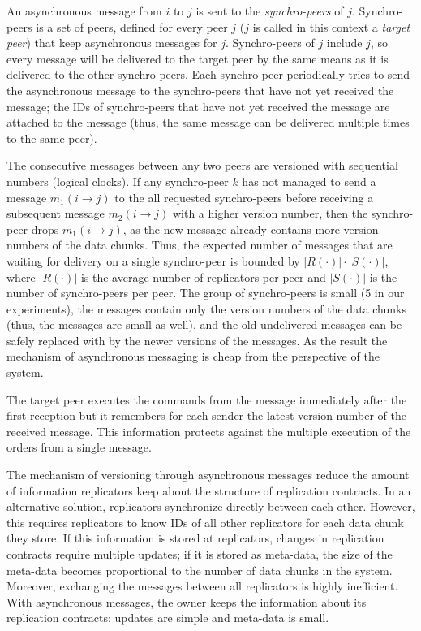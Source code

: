 \documentclass[10pt, final, conference, letterpaper]{IEEEtran}
\begin{document}
An asynchronous message from $i$ to $j$ is sent to the \emph{synchro-peers} of $j$. 
Synchro-peers is a set of peers, defined for every peer $j$ ($j$ is called in this context a \emph{target peer})
that keep asynchronous messages for $j$. Synchro-peers of $j$ include $j$, so every message will be delivered to the target peer by the same means as it is delivered to the other synchro-peers.
Each synchro-peer periodically tries to send the asynchronous message to the synchro-peers that have not yet received the message; the IDs of synchro-peers that have not yet received the message are attached to the message (thus, the same message can be delivered multiple times to the same peer).

The consecutive messages between any two peers are versioned with sequential numbers (logical clocks). If any synchro-peer $k$ has not managed to send a message $m_{1}(i \to j)$ to the all requested synchro-peers before receiving a subsequent message $m_{2}(i \to j)$ with a higher version number, then the synchro-peer drops $m_1(i \to j)$, as the new message already contains more version numbers of the data chunks. Thus, the expected number of messages that are waiting for delivery on a single synchro-peer is bounded by $|R(\cdot)| \cdot |S(\cdot)|$, where $|R(\cdot)|$ is the average number of replicators per peer and $|S(\cdot)|$ is the number of synchro-peers per peer. The group of synchro-peers is small (5 in our experiments), the messages contain only the version numbers of the data chunks (thus, the messages are small as well), and the old undelivered messages can be safely replaced with by the newer versions of the messages. As the result the mechanism of asynchronous messaging is cheap from the perspective of the system.

The target peer executes the commands from the message immediately after the first reception but it remembers for each sender the latest version number of the received message. This information protects against the multiple execution of the orders from a single message.

The mechanism of versioning through asynchronous messages reduce the amount of information replicators keep about the structure of replication contracts. In an alternative solution, replicators synchronize directly between each other. However, this requires replicators to know IDs of all other replicators for each data chunk they store. If this information is stored at replicators, changes in replication contracts require multiple updates; if it is stored as meta-data, the size of the meta-data becomes proportional to the number of data chunks in the system. Moreover, exchanging the messages between all replicators is highly inefficient. With asynchronous messages, the owner keeps the information about its replication contracts: updates are simple and meta-data is small.
\end{document}

